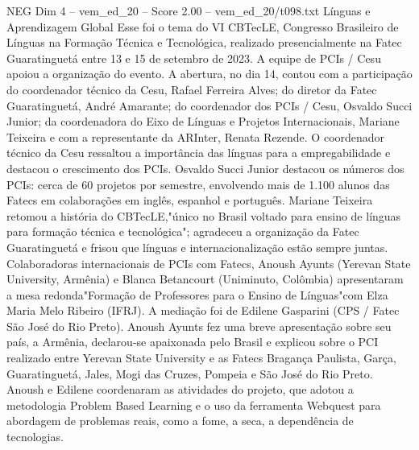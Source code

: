 \begin{textsample}{NEG Dim 4 – vem\_ed\_20 – Score 2.00 – vem\_ed\_20/t098.txt}  \label{ex:f4_neg_008}
Línguas e Aprendizagem Global Esse foi o tema do VI CBTecLE, Congresso Brasileiro de Línguas na Formação Técnica e Tecnológica, realizado presencialmente na Fatec Guaratinguetá entre 13 e 15 de setembro de 2023.
A equipe de PCIs / Cesu apoiou a organização do evento.
A abertura, no dia 14, contou com a participação do coordenador técnico da Cesu, Rafael Ferreira Alves; do diretor da Fatec Guaratinguetá, André Amarante; do coordenador dos PCIs / Cesu, Osvaldo Succi Junior; da coordenadora do Eixo de Línguas e Projetos Internacionais, Mariane Teixeira e com a representante da ARInter, Renata Rezende.
O coordenador técnico da Cesu ressaltou a importância das línguas para a empregabilidade e destacou o crescimento dos PCIs.
Osvaldo Succi Junior destacou os números dos PCIs: cerca de 60 projetos por semestre, envolvendo mais de 1.100 alunos das Fatecs em colaborações em inglês, espanhol e português.
Mariane Teixeira retomou a história do CBTecLE,"único no Brasil voltado para ensino de línguas para formação técnica e tecnológica"; agradeceu a organização da Fatec Guaratinguetá e frisou que línguas e internacionalização estão sempre juntas.
Colaboradoras internacionais de PCIs com Fatecs, Anoush Ayunts (Yerevan State University, Armênia) e Blanca Betancourt (Uniminuto, Colômbia) apresentaram a mesa redonda"Formação de Professores para o Ensino de Línguas"com Elza Maria Melo Ribeiro (IFRJ).
A mediação foi de Edilene Gasparini (CPS / Fatec São José do Rio Preto).
Anoush Ayunts fez uma breve apresentação sobre seu país, a Armênia, declarou-se apaixonada pelo Brasil e explicou sobre o PCI realizado entre Yerevan State University e as Fatecs Bragança Paulista, Garça, Guaratinguetá, Jales, Mogi das Cruzes, Pompeia e São José do Rio Preto.
Anoush e Edilene coordenaram as atividades do projeto, que adotou a metodologia Problem Based Learning e o uso da ferramenta Webquest para abordagem de problemas reais, como a fome, a seca, a dependência de tecnologias.

\end{textsample}
